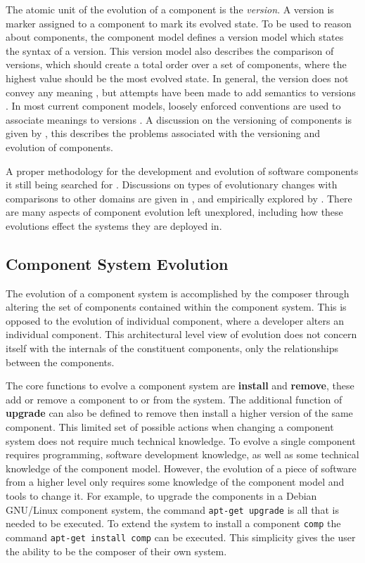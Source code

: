 The atomic unit of the evolution of a component is the \textit{version}.
A version is marker assigned to a component to mark its evolved state.
To be used to reason about components, the component model defines a version model which states the syntax of a version.
This version model also describes the comparison of versions, which should create a total order over a set of components, where the highest value should be the most evolved state.
In general, the version does not convey any meaning \citep{Stuckenholz2005}, but attempts have been made to add semantics to versions \cite{Bauml2009}.
In most current component models, loosely enforced conventions are used to associate meanings to versions \cite{Barth2005,osgicore2007}.
A discussion on the versioning of components is given by \cite{Stuckenholz2005},
this describes the problems associated with the versioning and evolution of components.

A proper methodology for the development and evolution of software components it still being searched for \citep{Szyperski2002}.
Discussions on types of evolutionary changes with comparisons to other domains are given in \citep{Papazoglou2011},
and empirically explored by \cite{vasa2007patterns}.
There are many aspects of component evolution left unexplored, including how these evolutions effect the systems they are deployed in.

\subsection{Component System Evolution}
The evolution of a component system is accomplished by the composer through altering the set of components contained within the component system.
This is opposed to the evolution of individual component, where a developer alters an individual component.
This architectural level view of evolution does not concern itself with the internals of the constituent components, only the relationships between the components.

The core functions to evolve a component system are \textbf{install} and \textbf{remove}, these add or remove a component to or from the system.
The additional function of \textbf{upgrade} can also be defined to remove then install a higher version of the same component. 
This limited set of possible actions when changing a component system does not require much technical knowledge. 
To evolve a single component requires programming, software development knowledge, as well as some technical knowledge of the component model.
However, the evolution of a piece of software from a higher level only requires some knowledge of the component model and tools to change it.
For example, to upgrade the components in a Debian GNU/Linux component system, the command \texttt{apt-get upgrade} is all that is needed to be executed.
To extend the system to install a component \texttt{comp} the command \texttt{apt-get install comp} can be executed.
This simplicity gives the user the ability to be the composer of their own system.

